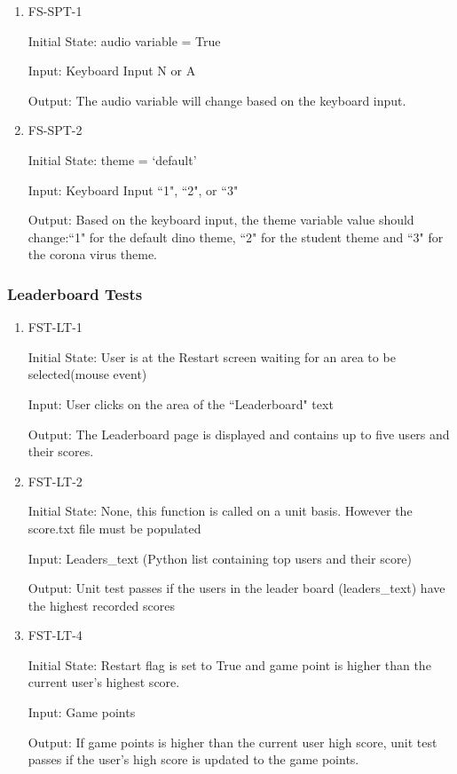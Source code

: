 \documentclass[12pt, titlepage]{article}
\begin{document}
	\begin{enumerate}
		
		\item{FS-SPT-1\\}
		
		Initial State: audio variable = True
		
		Input: Keyboard Input N or A 
		
		Output: The audio variable will change based on the keyboard input. 
		
		
		\item{FS-SPT-2\\}
		
		
		Initial State: theme = `default'
		
		Input: Keyboard Input ``1", ``2", or ``3"
		
		Output: Based on the keyboard input, the theme variable value should change:``1" for the default dino theme, ``2" for the student theme and ``3" for the corona virus theme.
		
	\end{enumerate}
	
	
	
	\subsubsection{Leaderboard Tests}
	
	\begin{enumerate}
		
		\item{FST-LT-1\\}
		
		Initial State: User is at the Restart screen waiting for an area to be selected(mouse event)
		
		Input: User clicks on the area of the ``Leaderboard" text
		
		Output: The Leaderboard page is displayed and contains up to five users and their scores.
		
		
		\item{FST-LT-2\\}
		
		Initial State: None, this function is called on a unit basis. However the score.txt file must be populated
		
		Input: Leaders\_text (Python list containing top users and their score)
		
		Output: Unit test passes if the users in the leader board (leaders\_text) have the highest recorded scores
		
		
		\item{FST-LT-4\\}
		
		Initial State: Restart flag is set to True and game point is higher than the current user's highest score.
		
		Input: Game points
		
		Output: If game points is higher than the current user high score, unit test passes if the user's high score is updated to the game points.
		
		
	\end{enumerate}
	
\end{document}
